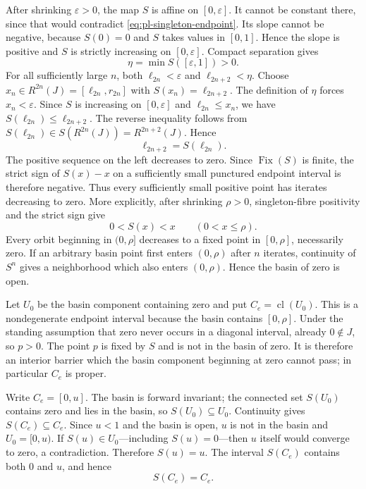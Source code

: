 \documentclass[11pt]{article}
\theoremstyle{definition}
\theoremstyle{remark}
\newcommand{\Fix}{\operatorname{Fix}}
\newcommand{\cl}{\operatorname{cl}}
\begin{document}
After shrinking \(\varepsilon>0\), the map \(S\) is affine on
\([0,\varepsilon]\).  It cannot be constant there, since that would
contradict \eqref{eq:pl-singleton-endpoint}.  Its slope cannot be negative,
because \(S(0)=0\) and \(S\) takes values in \([0,1]\).  Hence the slope is
positive and \(S\) is strictly increasing on \([0,\varepsilon]\).
Compact separation gives
\[
 \eta=\min S([\varepsilon,1])>0.
\]
For all sufficiently large \(n\), both
\(\ell_{2n}<\varepsilon\) and \(\ell_{2n+2}<\eta\).  Choose
\(x_n\in R^{2n}(J)=[\ell_{2n},r_{2n}]\) with
\(S(x_n)=\ell_{2n+2}\).  The definition of \(\eta\) forces
\(x_n<\varepsilon\).  Since \(S\) is increasing on
\([0,\varepsilon]\) and \(\ell_{2n}\leq x_n\), we have
\(S(\ell_{2n})\leq\ell_{2n+2}\).  The reverse inequality follows from
\(S(\ell_{2n})\in S(R^{2n}(J))=R^{2n+2}(J)\).  Hence
\[
 \ell_{2n+2}=S(\ell_{2n}).
\]
The positive sequence on the left decreases to zero.  Since \(\Fix(S)\) is
finite, the strict sign of \(S(x)-x\) on a sufficiently small punctured
endpoint interval is therefore negative.  Thus every sufficiently small
positive point has iterates decreasing to zero.  More explicitly, after
shrinking \(\rho>0\), singleton-fibre positivity and the strict sign give
\[
 0<S(x)<x\qquad(0<x\leq\rho).
\]
Every orbit beginning in \((0,\rho]\) decreases to a fixed point in
\([0,\rho]\), necessarily zero.  If an arbitrary basin point first enters
\((0,\rho)\) after \(n\) iterates, continuity of \(S^n\) gives a neighborhood
which also enters \((0,\rho)\).  Hence the basin of zero is open.

Let \(U_0\) be the basin component containing zero and put
\(C_e=\cl(U_0)\).  This is a nondegenerate endpoint interval because the
basin contains $[0,\rho]$.  Under the standing assumption that zero never
occurs in a diagonal interval, already $0\notin J$, so $p>0$.  The point
$p$ is fixed by $S$ and is not in the basin of zero.  It is therefore an
interior barrier which the basin component beginning at zero cannot pass;
in particular $C_e$ is proper.

Write $C_e=[0,u]$.  The basin is forward invariant; the connected set
$S(U_0)$ contains zero and lies in the basin, so $S(U_0)\subseteq U_0$.
Continuity gives $S(C_e)\subseteq C_e$.  Since $u<1$ and the basin is open,
$u$ is not in the basin and $U_0=[0,u)$.  If $S(u)\in U_0$---including
$S(u)=0$---then $u$ itself would converge to zero, a contradiction.
Therefore $S(u)=u$.  The interval $S(C_e)$ contains both $0$ and $u$, and
hence
\begin{equation}\label{eq:pl-basin-onto}
 S(C_e)=C_e.
\end{equation}
\end{document}
